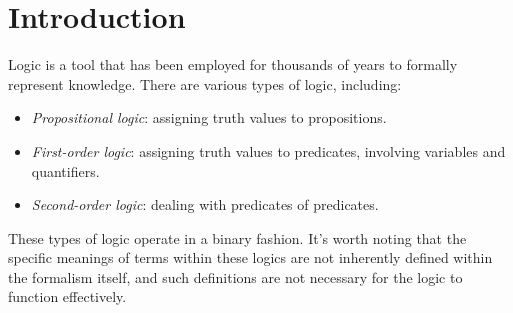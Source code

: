 \section{Introduction}

Logic is a tool that has been employed for thousands of years to formally represent knowledge. There are various types of logic, including:
\begin{itemize}
    \item \textit{Propositional logic}: assigning truth values to propositions.
    \item \textit{First-order logic}: assigning truth values to predicates, involving variables and quantifiers.
    \item \textit{Second-order logic}: dealing with predicates of predicates.
\end{itemize}
These types of logic operate in a binary fashion. 
It's worth noting that the specific meanings of terms within these logics are not inherently defined within the formalism itself, and such definitions are not necessary for the logic to function effectively.